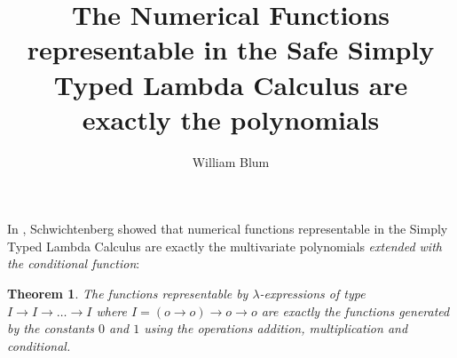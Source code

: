 \documentclass{article}
\author{William Blum}
\title{The Numerical Functions representable in the Safe Simply Typed Lambda Calculus are exactly the polynomials}
\newtheorem{theorem}{Theorem}[section]
\begin{document}
\maketitle

In \cite{citeulike:622637}, Schwichtenberg showed that 
numerical functions representable in the Simply Typed Lambda Calculus are exactly the multivariate polynomials \emph{extended with the conditional function}:
\begin{theorem}
The functions representable by $\lambda$-expressions of type $I\rightarrow I \rightarrow \ldots \rightarrow I$ where $I = (o\rightarrow o)\rightarrow o\rightarrow o$ are exactly the functions generated by the constants $0$ and $1$ using the operations addition, multiplication and conditional.
\end{theorem}
\end{document}
